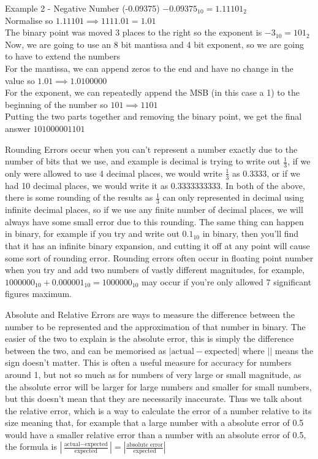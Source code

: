   Example 2 - Negative Number (-0.09375)
  $-0.09375_{10} = 1.11101_2$ \\
  Normalise so $1.11101 \implies 1111.01 = 1.01 $\\
  The binary point was moved 3 places to the right so the exponent is $-3_{10} = 101_2$
  Now, we are going to use an 8 bit mantissa and 4 bit exponent, so we are going to have to extend the numbers \\
  For the mantissa, we can append zeros to the end and have no change in the value so $1.01 \implies 1.0100000$ \\
  For the exponent, we can repeatedly append the MSB (in this case a 1) to the beginning of the number so $ 101 \implies 1101$ \\
  Putting the two parts together and removing the binary point, we get the final answer $101000001101$
  
  
  \noindent
  Rounding Errors occur when you can't represent a number exactly due to the number of bits that we use, and example is decimal is trying to write out $\frac{1}{3}$, if we only were allowed to use 4 decimal places, we would write $\frac{1}{3}$ as 0.3333, or if we had 10 decimal places, we would write it as 0.3333333333. In both of the above, there is some rounding of the results as $\frac{1}{3}$ can only represented in decimal using infinite decimal places, so if we use any finite number of decimal places, we will always have some small error due to this rounding. The same thing can happen in binary, for example if you try and write out $0.1_{10}$ in binary, then you'll find that it has an infinite binary expansion, and cutting it off at any point will cause some sort of rounding error. Rounding errors often occur in floating point number when you try and add two numbers of vastly different magnitudes, for example, $1000000_{10} + 0.000001_{10} = 1000000_{10}$ may occur if you're only allowed 7 significant figures maximum.
  
  \noindent
  Absolute and Relative Errors are ways to measure the difference between the number to be represented and the approximation of that number in binary. The easier of the two to explain is the absolute error, this is simply the difference between the two, and can be memorised as $|\text{actual}-\text{expected}|$ where $||$ means the sign doesn't matter. This is often a useful measure for accuracy for numbers around 1, but not so much as for numbers of very large or small magnitude, as the absolute error will be larger for large numbers and smaller for small numbers, but this doesn't mean that they are necessarily inaccurate. Thus we talk about the relative error, which is a way to calculate the error of a number relative to its size meaning that, for example that a large number with a absolute error of 0.5 would have a smaller relative error than a number with an absolute error of 0.5, the formula is $|\frac{\text{actual}-\text{expected}}{\text{expected}}|=|\frac{\text{absolute error}}{\text{expected}}|$
  
